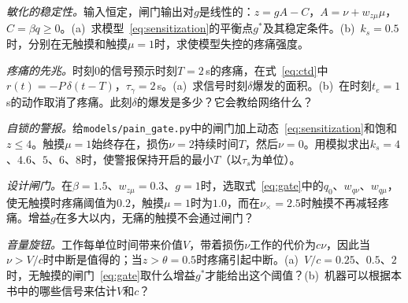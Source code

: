 \begin{exercise}[\lvlB]
\label{ex:14:3}
\emph{敏化的稳定性。}输入恒定，闸门输出对$g$是线性的：$z=gA-C$，$A=\nu+w_{z\mu}\mu$，$C=\beta q\ge0$。(a)~求模型~\eqref{eq:sensitization}的平衡点$g^*$及其稳定条件。(b)~$k_s=0.5$时，分别在无触摸和触摸$\mu=1$时，求使模型失控的疼痛强度。
\end{exercise}

\begin{exercise}[\lvlA]
\label{ex:14:4}
\emph{疼痛的先兆。}时刻$0$的信号预示时刻$T=2$\,s的疼痛，在式~\eqref{eq:ctd}中$r(t)=-P\,\delta(t-T)$，$\tau_\gamma=2$\,s。(a)~求信号时刻$\delta$爆发的面积。(b)~在时刻$t_e=1$\,s的动作取消了疼痛。此刻$\delta$的爆发是多少？它会教给网络什么？
\end{exercise}

\begin{exercise}[\lvlB]
\label{ex:14:5}
\emph{自锁的警报。}给\texttt{models/\allowbreak pain\_gate.py}中的闸门加上动态~\eqref{eq:sensitization}和饱和$z\le4$。触摸$\mu=1$始终存在，损伤$\nu=2$持续时间$T$，然后$\nu=0$。用模拟求出$k_s=4$、$4.6$、$5$、$6$、$8$时，使警报保持开启的最小$T$（以$\tau_s$为单位）。
\end{exercise}

\begin{exercise}[\lvlB]
\label{ex:14:6}
\emph{设计闸门。}在$\beta=1.5$、$w_{z\mu}=0.3$、$g=1$时，选取式~\eqref{eq:gate}中的$q_0$、$w_{q\nu}$、$w_{q\mu}$，使无触摸时疼痛阈值为$0.2$，触摸$\mu=1$时为$1.0$，而在$\nu_\times=2.5$时触摸不再减轻疼痛。增益$g$在多大以内，无痛的触摸不会通过闸门？
\end{exercise}

\begin{exercise}[\lvlC]
\label{ex:14:7}
\emph{音量旋钮。}工作每单位时间带来价值$V$，带着损伤$\nu$工作的代价为$c\nu$，因此当$\nu>V/c$时中断是值得的；当$z>\theta=0.5$时疼痛引起中断。(a)~$V/c=0.25$、$0.5$、$2$时，无触摸的闸门~\eqref{eq:gate}取什么增益$g^*$才能给出这个阈值？(b)~机器可以根据本书中的哪些信号来估计$V$和$c$？
\end{exercise}
